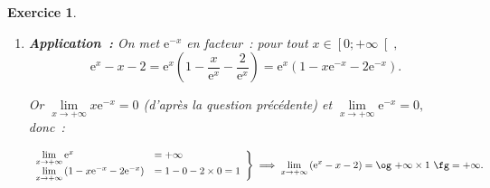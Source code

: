 \documentclass[10pt]{article}
\newtheorem{exo}{Exercice}
\begin{document}
\begin{exo}
\begin{enumerate}
\[\lim\limits_{x\to +\infty}x\text{e}^{-x}=0.\]
\item \textbf{Application~:} On met $\text{e}^{-x}$ en facteur~: pour tout $x\in\left[0;+\infty\right[,$
\[\text{e}^x-x-2=\text{e}^x\left(1-\frac{x}{\text{e}^x}-\frac{2}{\text{e}^x}\right)=
\text{e}^x\left(1-x\text{e}^{-x}-2\text{e}^{-x}\right).\]
 
 Or $\lim\limits_{x\to +\infty}x\text{e}^{-x}=0$ (d'après la question précédente) et  $\lim\limits_{x\to +\infty}\text{e}^{-x}=0,$ donc~:
 
 \[
\left.
    \begin{array}{ll}
        \lim\limits_{x\to +\infty}\text{e}^x&=  +\infty\\
        \lim\limits_{x\to +\infty}\left(1-x\text{e}^{-x}-2\text{e}^{-x}\right) &= 1-0-2\times 0=1
    \end{array}
\right \}\implies \lim\limits_{x\to +\infty}\left(\text{e}^x-x-2\right)=\text{\og}~{+\infty}\times 1~\text{\fg}=+\infty.
\]
 
\end{enumerate}

\end{exo}
\end{document}
